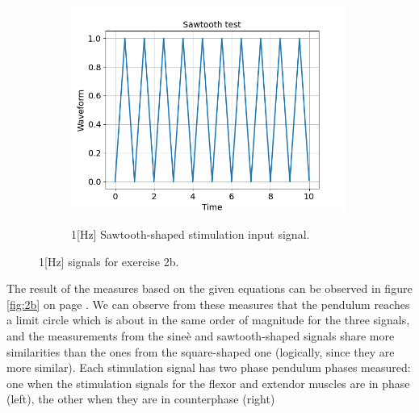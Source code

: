 \documentclass{cmc}
\begin{document}
\begin{figure}[H]
  \begin{subfigure}[b]{0.48\textwidth}
    { \centering
      \includegraphics[width=0.99\textwidth]{figures/2b_Sawtooth_test.png} }
    \caption{1[Hz] Sawtooth-shaped stimulation input signal.}
    \label{fig:2b_square_signal}
  \end{subfigure}

  \caption{1[Hz] signals for exercise 2b.}
  \label{fig:2b_signals}
\end{figure}


The result of the measures based on the given equations can be observed in figure \ref{fig:2b} on page \pageref{fig:2b}. We can observe from these measures that the pendulum reaches a limit circle which is about in the same order of magnitude for the three signals, and the measurements from the sineè and sawtooth-shaped signals share more similarities than the ones from the square-shaped one (logically, since they are more similar).
Each stimulation signal has two phase pendulum phases measured: one when the stimulation signals for the flexor and extendor muscles are in phase (left), the other when they are in counterphase (right)
\end{document}

